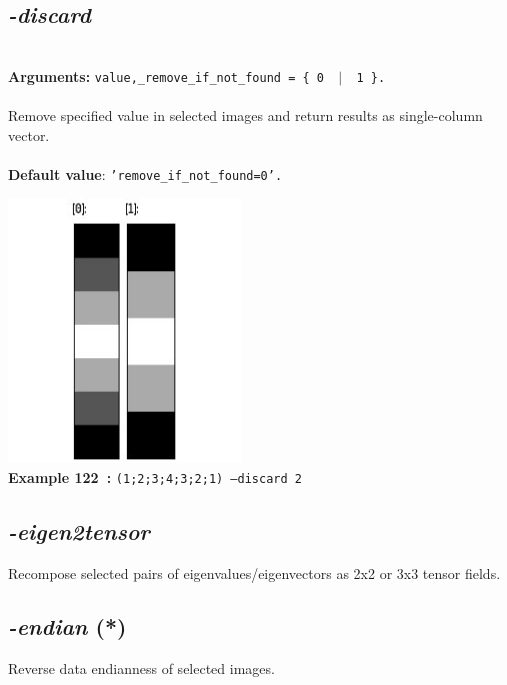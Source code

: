 \documentclass[a4paper,11pt,twoside]{book}
\begin{document}
\subsection{\emph{-discard} }\vspace*{-0.5em}
~\\\textbf{Arguments: } 
{\small \texttt{value,\_remove\_if\_not\_found = \{ 0 ~$|$~ 1 \}.}}\\~\\
Remove specified value in selected images and return results as single-column vector.
~\\~\\\textbf{Default value}: {\small \texttt{'remove\_if\_not\_found=0'.}}
\begin{center}\includegraphics[keepaspectratio=true,height=7cm,width=\textwidth]{img/gmic_def122.jpg}\\
{\footnotesize \textbf{Example 122~:} \texttt{(1;2;3;4;3;2;1) --discard 2}}
\end{center}

\subsection{\emph{-eigen2tensor} }\vspace*{-0.5em}
Recompose selected pairs of eigenvalues/eigenvectors as 2x2 or 3x3 tensor fields.


\subsection{\emph{-endian} (*)}\vspace*{-0.5em}
Reverse data endianness of selected images.
\end{document}
